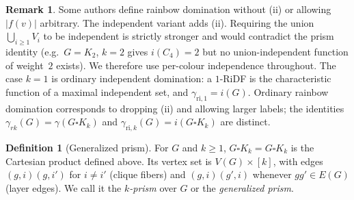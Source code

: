 \documentclass[11pt,a4paper]{article}
\theoremstyle{plain}
\theoremstyle{definition}
\newtheorem{definition}[theorem]{Definition}
\newtheorem{remark}[theorem]{Remark}
\newcommand{\gri}{\gamma_{\mathrm{ri},k}}
\newcommand{\cardK}{\square K_k}
\newcommand{\setK}{[k]}
\begin{document}
\begin{remark}
Some authors define rainbow domination without (ii) or allowing $|f(v)|$ arbitrary.
The independent variant adds (ii). Requiring the union $\bigcup_{i\ge1}V_{i}$ to be independent is strictly stronger and would contradict the prism identity (e.g.\ $G=K_{2}$, $k=2$ gives $i(C_{4})=2$ but no union-independent function of weight~$2$ exists). We therefore use per-colour independence throughout.
The case $k=1$ is ordinary independent domination: a $1$-RiDF is the characteristic function of a maximal independent set, and $\gamma_{\mathrm{ri},1}=i(G)$.
Ordinary rainbow domination \cite{BresarSum2007,HartnellRall2013} corresponds to dropping (ii) and allowing larger labels; the identities $\gamma_{rk}(G)=\gamma(G\cardK)$ and $\gri(G)=i(G\cardK)$ are distinct.
\end{remark}

\begin{definition}[Generalized prism]\label{def:prism}
For $G$ and $k\ge 1$, $G\cardK = G\square K_{k}$ is the Cartesian product defined above.
Its vertex set is $V(G)\times\setK$, with edges $(g,i)(g,i')$ for $i\neq i'$ (clique fibers) and $(g,i)(g',i)$ whenever $gg'\in E(G)$ (layer edges).
We call it the \emph{$k$-prism} over $G$ or the \emph{generalized prism}.
\end{definition}
\end{document}
